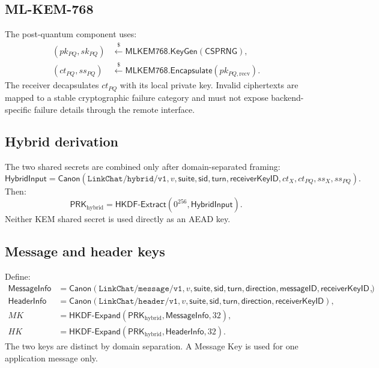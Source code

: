 \documentclass[11pt,letterpaper]{article}
\newcommand{\sample}{\xleftarrow{\$}}
\begin{document}
\subsection{ML-KEM-768}

The post-quantum component uses:
\[
  \begin{aligned}
    (pk_{PQ},sk_{PQ}) &\sample \mathsf{MLKEM768.KeyGen}(\mathsf{CSPRNG}),\\
    (ct_{PQ},ss_{PQ}) &\sample \mathsf{MLKEM768.Encapsulate}(pk_{PQ,\mathrm{recv}}).
  \end{aligned}
\]
The receiver decapsulates $ct_{PQ}$ with its local private key. Invalid ciphertexts are
mapped to a stable cryptographic failure category and must not expose backend-specific
failure details through the remote interface.

\subsection{Hybrid derivation}

The two shared secrets are combined only after domain-separated framing:
\[
  \mathsf{HybridInput}=\mathsf{Canon}(\texttt{LinkChat/hybrid/v1},v,\mathsf{suite},
      \mathsf{sid},\mathsf{turn},\mathsf{receiverKeyID},ct_X,ct_{PQ},ss_X,ss_{PQ}).
\]
Then:
\[
  \mathsf{PRK}_{\mathrm{hybrid}}=
  \mathsf{HKDF\mbox{-}Extract}(0^{256},\mathsf{HybridInput}).
\]
Neither KEM shared secret is used directly as an AEAD key.

\subsection{Message and header keys}

Define:
\begin{align*}
  \mathsf{MessageInfo} &= \mathsf{Canon}(\texttt{LinkChat/message/v1},v,\mathsf{suite},
    \mathsf{sid},\mathsf{turn},\mathsf{direction},\mathsf{messageID},\mathsf{receiverKeyID}),\\
  \mathsf{HeaderInfo} &= \mathsf{Canon}(\texttt{LinkChat/header/v1},v,\mathsf{suite},
    \mathsf{sid},\mathsf{turn},\mathsf{direction},\mathsf{receiverKeyID}),\\
  MK &= \mathsf{HKDF\mbox{-}Expand}(\mathsf{PRK}_{\mathrm{hybrid}},\mathsf{MessageInfo},32),\\
  HK &= \mathsf{HKDF\mbox{-}Expand}(\mathsf{PRK}_{\mathrm{hybrid}},\mathsf{HeaderInfo},32).
\end{align*}
The two keys are distinct by domain separation. A Message Key is used for one application
message only.
\end{document}
